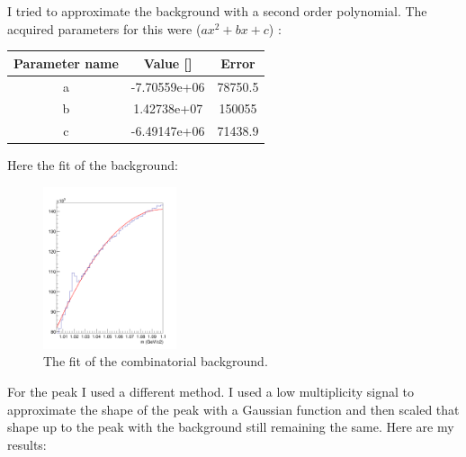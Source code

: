 \documentclass[a4paper,12pt]{article}
\begin{document}
\par I tried to approximate the background with a second order polynomial. The acquired parameters for this were ($ax^{2} + bx +c$) :
\begin{center}
	\begin{tabular}{|c|c|c|}
		\hline
		Parameter name & Value [] & Error \\
		\hline
		a & -7.70559e+06 & 78750.5 \\
		\hline
		b & 1.42738e+07 & 150055 \\
		\hline
		c & -6.49147e+06 & 71438.9 \\
		\hline
	\end{tabular}
\end{center}
\par Here the fit of the background:
\begin{figure}[H]
	\centering
	\includegraphics[width=0.35\textwidth]{combiback_fit.png}
	\caption{ The fit of the combinatorial background. }
\end{figure}
\par For the peak I used a different method. I used a low multiplicity signal to approximate the shape of the peak with a Gaussian function and then scaled that shape up to the peak with the background still remaining the same. Here are my results:
\end{document}
